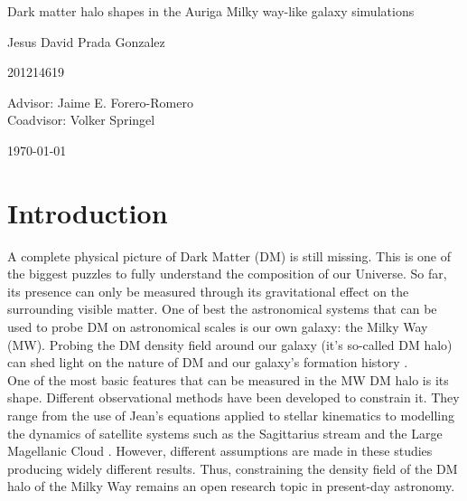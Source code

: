 \documentclass[12pt]{article}
\begin{document}
\begin{center}
\Huge
Dark matter halo shapes in the Auriga Milky way-like galaxy simulations

\vspace{3mm}
\Large Jesus David Prada Gonzalez

\large
201214619


\vspace{2mm}
\Large
Advisor: Jaime E. Forero-Romero\\
Coadvisor: Volker Springel
\normalsize
\vspace{2mm}

\today
\end{center}


\normalsize
\section{Introduction}


A complete physical picture of Dark Matter (DM) is still missing.
This is one of the biggest puzzles to fully understand the composition of our Universe.
So far, its presence can only be measured through its gravitational effect on the surrounding visible matter. 
One of best the astronomical systems that can be used to probe DM on astronomical scales is our own galaxy: the Milky Way (MW).
Probing the DM density field around our galaxy (it's so-called DM halo) can shed light on the nature of DM \cite{Nipoti,ReadMoore} and our galaxy's formation history \cite{Read1,Read2,Vera-Ciro2011}.\\

One of the most basic features that can be measured in the MW DM halo is its shape. 
Different observational methods have been developed to constrain it. 
They range from the use of Jean's equations applied to stellar kinematics \cite{Loebman2012} to modelling the dynamics of satellite systems such as the Sagittarius stream and the Large Magellanic Cloud \cite{Vera-Ciro2013,Deg2012,LawMajewski2010}. 
However, different assumptions are made in these studies producing widely different results.
Thus, constraining the density field of the DM halo of the Milky Way remains an open research topic in present-day astronomy.\\ 
\end{document}
